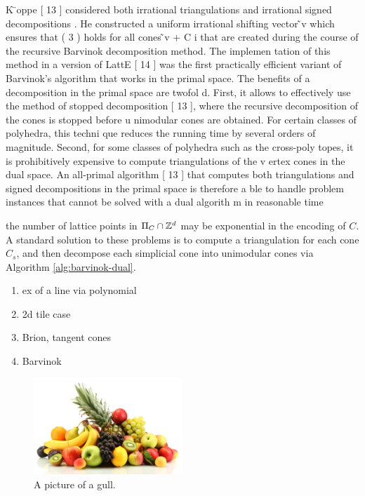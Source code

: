 K ̈oppe [
13
] considered both irrational triangulations and
irrational signed
decompositions
. He constructed a
uniform
irrational shifting vector
 ̃v
which
ensures that (
3
) holds for all cones
 ̃v
+
C
i
that are created during the course of
the recursive Barvinok decomposition method. The implemen
tation of this
method in a version of LattE [
14
] was the first practically efficient variant
of Barvinok’s algorithm that works in the primal space.
The benefits of a decomposition in the primal space are twofol
d. First,
it allows to effectively use the method of
stopped decomposition
[
13
], where
the recursive decomposition of the cones is stopped before u
nimodular cones
are obtained. For certain classes of polyhedra, this techni
que reduces the
running time by several orders of magnitude.
Second, for some classes of polyhedra such as the cross-poly
topes, it is
prohibitively expensive to compute triangulations of the v
ertex cones in the
dual space. An
all-primal algorithm
[
13
] that computes both triangulations
and signed decompositions in the primal space is therefore a
ble to handle
problem instances that cannot be solved with a dual algorith
m in reasonable
time


the number of lattice points in $\Pi_C \cap {\mathbb Z}^d$ may be exponential in the encoding of $C$. A standard solution to these problems is to compute a triangulation for each cone $C_s$, and then decompose each simplicial cone into unimodular cones via Algorithm \ref{alg:barvinok-dual}.
 
 
   \begin{enumerate}
   \item ex of a line via polynomial
   \item 2d tile case
   \item Brion, tangent cones
   \item Barvinok
   
   \end{enumerate}
   
   
   
   \begin{figure}[h!]
  \caption{A picture of a gull.}
  \centering
    \includegraphics[width=0.5\textwidth]{figures/fruit.jpg}
\end{figure}
   
